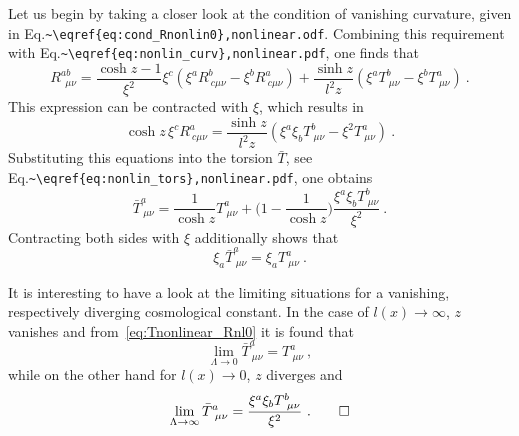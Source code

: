 \documentclass[11pt]{article}
\begin{document}
\blankline
Let us begin by taking a closer look at the condition of 
vanishing curvature, given in 
Eq.\verb+~\eqref{eq:cond_Rnonlin0},nonlinear.odf+.  Combining 
this requirement with 
Eq.\verb+~\eqref{eq:nonlin_curv},nonlinear.pdf+, one finds that
\begin{displaymath}
	R^{ab}_{~~\mu\nu} = \frac{\cosh z - 1}{\xi^2} \xi^c (\xi^a 
	R^b_{~c\mu\nu} - \xi^b R^a_{~c\mu\nu}) + \frac{\sinh z}{l^2 z} 
	(\xi^a T^b_{~\mu\nu} - \xi^b T^a_{~\mu\nu})~.
\end{displaymath}
This expression can be contracted with $\xi$, which results in
\begin{equation}
	\cosh z\, \xi^c R^a_{~c\mu\nu} = \frac{\sinh z}{l^2 z} (\xi^a 
	\xi_b	T^b_{~\mu\nu} - \xi^2 T^a_{~\mu\nu})~.
\end{equation}
Substituting this equations into the torsion $\bar{T}$, see 
Eq.\verb+~\eqref{eq:nonlin_tors},nonlinear.pdf+, one obtains
\begin{equation}
	\label{eq:Tnonlinear_Rnl0}
	\bar{T}^a_{~\mu\nu} = \frac{1}{\cosh z} T^a_{~\mu\nu} + 
	\bigg(1-\frac{1}{\cosh z}\bigg) \frac{\xi^a\xi_b 
		T^b_{~\mu\nu}}{\xi^2}~.
\end{equation}
Contracting both sides with $\xi$ additionally shows 
that
\begin{displaymath}
	\xi_a \bar{T}^a_{~\mu\nu} = \xi_a T^a_{~\mu\nu}~.
\end{displaymath}
\begin{remark}
	It is interesting to have a look at the limiting situations 
	for a vanishing, respectively diverging cosmological constant.  
	In the case of $l(x) \to \infty$, $z$ vanishes and 
	from~\eqref{eq:Tnonlinear_Rnl0} it is found that
	\begin{displaymath}
		\lim_{\Lambda \to 0} \bar{T}^a_{~\mu\nu} = T^a_{~\mu\nu}~,
	\end{displaymath}
	while on the other hand for $l(x) \to 0$, $z$ diverges and
	\begin{displaymath}
		\lim_{\Lambda \to \infty} \bar{T}^a_{~\mu\nu} = 
		\frac{\xi^a\xi_b T^b_{~\mu\nu}}{\xi^2}~.
		\qedhere
	\end{displaymath}
\end{remark}
\end{document}
